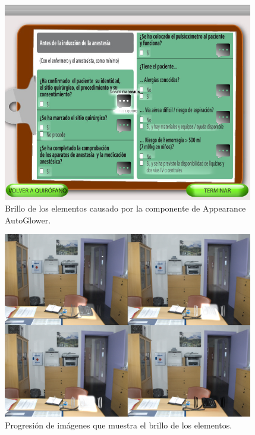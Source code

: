 \begin{figure}[h!]
	\centerline{\includegraphics[width=4.3in]{figures/it2/apearance/checklist.png}}
	\caption[Apearance - AutoGlower]{Brillo de los elementos causado por la componente de Appearance AutoGlower.}
	\label{autoglow1it2}
\end{figure}

\begin{figure}[h!]
	\centerline{\includegraphics[width=4.3in]{figures/it2/apearance/fire.png}}
	\caption[Apearance - Progresión de AutoGlower]{Progresión de imágenes que muestra el brillo de los elementos.}
	\label{autoglow2it2}
\end{figure}

